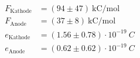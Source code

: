 \begin{align*}
F_\text{Kathode} &= (94 \pm 47)~\text{kC/mol}\\
F_\text{Anode} &= (37 \pm 8)~\text{kC/mol} \\
e_\text{Kathode} &= (1.56 \pm 0.78)\cdot 10^{-19}~C \\
e_\text{Anode} &= (0.62 \pm 0.62)\cdot 10^{-19}~C  
\end{align*}
